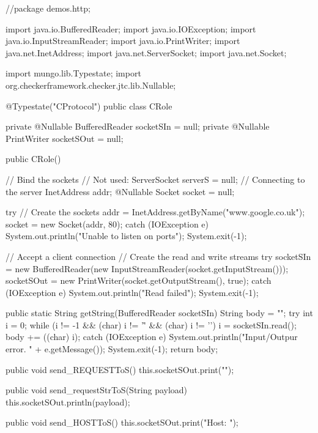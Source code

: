 \begin{code}
//package demos.http;

import java.io.BufferedReader;
import java.io.IOException;
import java.io.InputStreamReader;
import java.io.PrintWriter;
import java.net.InetAddress;
import java.net.ServerSocket;
import java.net.Socket;

import mungo.lib.Typestate;
import org.checkerframework.checker.jtc.lib.Nullable;

@Typestate("CProtocol")
public class CRole {
    private @Nullable BufferedReader socketSIn = null;
    private @Nullable PrintWriter socketSOut = null;

    public CRole() {
        // Bind the sockets
        // Not used: ServerSocket serverS = null;
        // Connecting to the server
        InetAddress addr;
        @Nullable Socket socket = null;

        try {// Create the sockets
            addr = InetAddress.getByName("www.google.co.uk");
            socket = new Socket(addr, 80);
        } catch (IOException e) {
            System.out.println("Unable to listen on ports");
            System.exit(-1);
        }

        // Accept a client connection
        // Create the read and write streams
        try {
            socketSIn = new BufferedReader(new InputStreamReader(socket.getInputStream()));
            socketSOut = new PrintWriter(socket.getOutputStream(), true);
        } catch (IOException e) {
            System.out.println("Read failed");
            System.exit(-1);
        }

    }

    public static String getString(BufferedReader socketSIn) {
        String body = "";
        try {
            int i = 0;
            while (i != -1 && (char) i != '\r' && (char) i != '\n') {
                i = socketSIn.read();
                body += ((char) i);
            }
        } catch (IOException e) {
            System.out.println("Input/Outpur error. " + e.getMessage());
            System.exit(-1);
        }
        return body;
    }

    public void send_REQUESTToS() {
        this.socketSOut.print("");
    }

    public void send_requestStrToS(String payload) {
        this.socketSOut.println(payload);
    }

    public void send_HOSTToS() {
        this.socketSOut.print("Host: ");
    }

}
\end{code}
